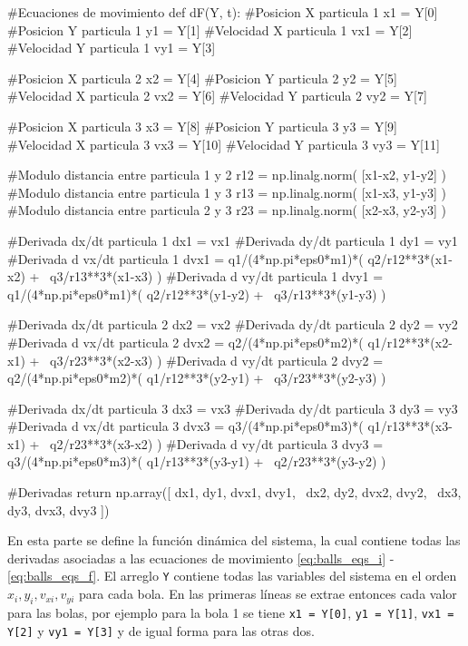 \begin{listing}[style=python, numbers = none]
#Ecuaciones de movimiento
def dF(Y, t):
    #Posicion X particula 1
    x1 = Y[0]
    #Posicion Y particula 1
    y1 = Y[1]
    #Velocidad X particula 1
    vx1 = Y[2]
    #Velocidad Y particula 1
    vy1 = Y[3]
    
    #Posicion X particula 2
    x2 = Y[4]
    #Posicion Y particula 2
    y2 = Y[5]
    #Velocidad X particula 2
    vx2 = Y[6]
    #Velocidad Y particula 2
    vy2 = Y[7]
    
    #Posicion X particula 3
    x3 = Y[8]
    #Posicion Y particula 3
    y3 = Y[9]
    #Velocidad X particula 3
    vx3 = Y[10]
    #Velocidad Y particula 3
    vy3 = Y[11]
    
    #Modulo distancia entre particula 1 y 2
    r12 = np.linalg.norm( [x1-x2, y1-y2] )
    #Modulo distancia entre particula 1 y 3
    r13 = np.linalg.norm( [x1-x3, y1-y3] )
    #Modulo distancia entre particula 2 y 3
    r23 = np.linalg.norm( [x2-x3, y2-y3] )
    
    #Derivada dx/dt particula 1
    dx1 = vx1
    #Derivada dy/dt particula 1
    dy1 = vy1
    #Derivada d vx/dt particula 1
    dvx1 = q1/(4*np.pi*eps0*m1)*( q2/r12**3*(x1-x2) + \
    q3/r13**3*(x1-x3) )
    #Derivada d vy/dt particula 1
    dvy1 = q1/(4*np.pi*eps0*m1)*( q2/r12**3*(y1-y2) + \
    q3/r13**3*(y1-y3) )
    
    #Derivada dx/dt particula 2
    dx2 = vx2
    #Derivada dy/dt particula 2
    dy2 = vy2
    #Derivada d vx/dt particula 2
    dvx2 = q2/(4*np.pi*eps0*m2)*( q1/r12**3*(x2-x1) + \
    q3/r23**3*(x2-x3) )
    #Derivada d vy/dt particula 2
    dvy2 = q2/(4*np.pi*eps0*m2)*( q1/r12**3*(y2-y1) + \
    q3/r23**3*(y2-y3) )
    
    #Derivada dx/dt particula 3
    dx3 = vx3
    #Derivada dy/dt particula 3
    dy3 = vy3
    #Derivada d vx/dt particula 3
    dvx3 = q3/(4*np.pi*eps0*m3)*( q1/r13**3*(x3-x1) + \
    q2/r23**3*(x3-x2) )
    #Derivada d vy/dt particula 3
    dvy3 = q3/(4*np.pi*eps0*m3)*( q1/r13**3*(y3-y1) + \
    q2/r23**3*(y3-y2) )

    #Derivadas
    return np.array([ dx1, dy1, dvx1, dvy1, \
    dx2, dy2, dvx2, dvy2, \
    dx3, dy3, dvx3, dvy3 ])
\end{listing}
En esta parte se define la función dinámica del sistema, la cual contiene
todas las derivadas asociadas a las ecuaciones de movimiento 
\ref{eq:balls_eqs_i} - \ref{eq:balls_eqs_f}. El arreglo \texttt{Y} contiene 
todas las variables del sistema en el orden $x_i, y_i, v_{xi}, v_{yi}$ para 
cada bola. En las primeras líneas se extrae entonces cada valor para las 
bolas, por ejemplo para la bola 1 se tiene \texttt{x1 = Y[0]}, 
\texttt{y1 = Y[1]}, \texttt{vx1 = Y[2]} y \texttt{vy1 = Y[3]} y de igual 
forma para las otras dos.

